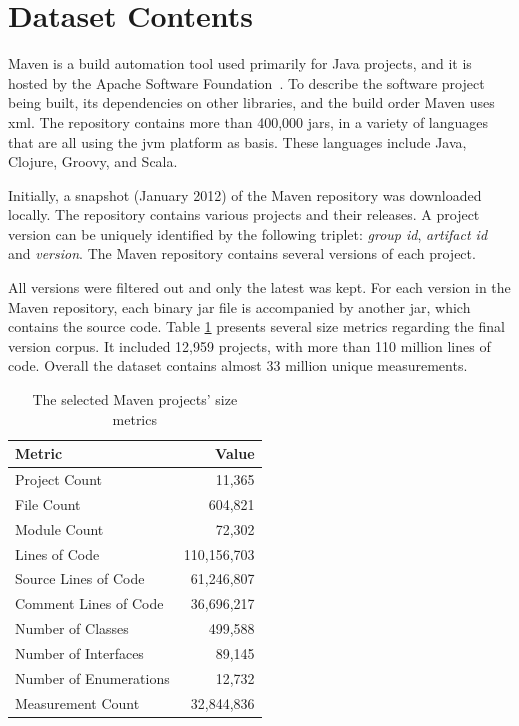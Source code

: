 \documentclass{sig-alternate}
\begin{document}
\section{Dataset Contents}
\label{sec:data}

 Maven is a build automation tool used primarily for Java projects, and it is hosted by the Apache Software Foundation~\cite{MAVEN}. To describe the software project being built, its dependencies on other libraries, and the build order Maven uses {\sc xml}. The repository contains more than 400,000 {\sc jar}s, in a variety of languages that are all using the {\sc jvm} platform as basis. These languages include Java, Clojure, Groovy, and Scala.

Initially, a snapshot (January 2012) of the Maven repository was downloaded locally. The repository contains various projects and their releases. A project version can be uniquely identified by the following triplet: {\it group id}, {\it artifact id} and {\it version}. The Maven repository contains several versions of each project.

All versions were filtered out and only the latest was kept. For each version in the Maven repository, each binary {\sc jar} file is accompanied by another {\sc jar}, which contains the source code. Table \ref{tbl:oss-size-metrics} presents several size metrics regarding the final version corpus. It included 12,959 projects, with more than 110 million lines of code. Overall the dataset contains almost 33 million unique measurements.

\begin{table}
\centering
\caption{The selected Maven projects' size metrics}
\label{tbl:oss-size-metrics}
\begin{tabular}{l r}
 \hline
\textbf{Metric} & \textbf{Value}\\
\hline
Project Count & 11,365\\
File Count & 604,821\\
Module Count & 72,302\\
Lines of Code & 110,156,703\\
Source Lines of Code & 61,246,807\\
Comment Lines of Code & 36,696,217\\
Number of Classes & 499,588\\
Number of Interfaces & 89,145\\
Number of Enumerations & 12,732\\
Measurement Count & 32,844,836\\
\hline
\end{tabular}
\end{table}
\end{document}
